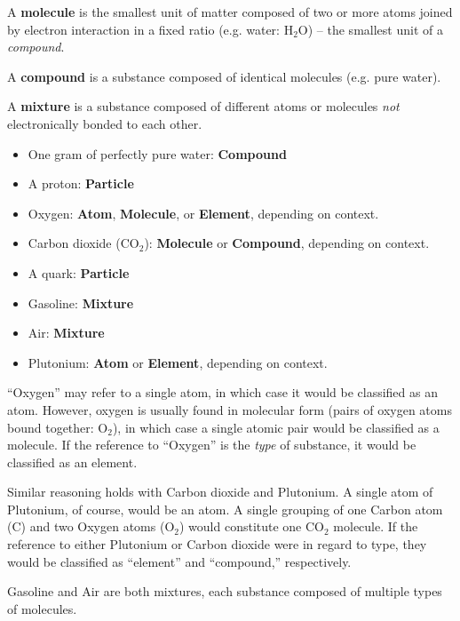 \vskip 10pt

A {\bf molecule} is the smallest unit of matter composed of two or more atoms joined by electron interaction in a fixed ratio (e.g. water: H$_{2}$O) -- the smallest unit of a {\it compound}.

\vskip 10pt

A {\bf compound} is a substance composed of identical molecules (e.g. pure water).

\vskip 10pt

A {\bf mixture} is a substance composed of different atoms or molecules {\it not} electronically bonded to each other.

\vskip 10pt

\begin{itemize}
\item{} One gram of perfectly pure water: {\bf Compound}
\item{} A proton: {\bf Particle}
\item{} Oxygen: {\bf Atom}, {\bf Molecule}, or {\bf Element}, depending on context.
\item{} Carbon dioxide (CO$_{2}$): {\bf Molecule} or {\bf Compound}, depending on context.
\item{} A quark: {\bf Particle}
\item{} Gasoline: {\bf Mixture}
\item{} Air: {\bf Mixture}
\item{} Plutonium: {\bf Atom} or {\bf Element}, depending on context.
\end{itemize} 

\vskip 10pt

``Oxygen'' may refer to a single atom, in which case it would be classified as an atom.  However, oxygen is usually found in molecular form (pairs of oxygen atoms bound together: O$_{2}$), in which case a single atomic pair would be classified as a molecule.  If the reference to ``Oxygen'' is the {\it type} of substance, it would be classified as an element.

\vskip 10pt

Similar reasoning holds with Carbon dioxide and Plutonium.  A single atom of Plutonium, of course, would be an atom.  A single grouping of one Carbon atom (C) and two Oxygen atoms (O$_{2}$) would constitute one CO$_{2}$ molecule.  If the reference to either Plutonium or Carbon dioxide were in regard to type, they would be classified as ``element'' and ``compound,'' respectively.

\vskip 10pt

Gasoline and Air are both mixtures, each substance composed of multiple types of molecules.











